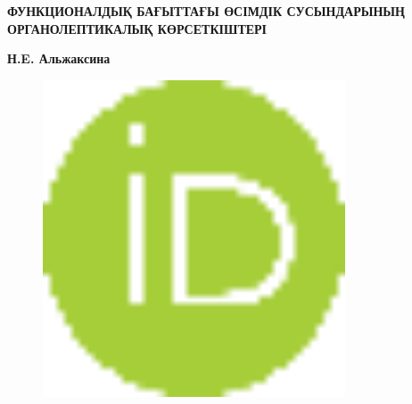 
{\bfseries ФУНКЦИОНАЛДЫҚ БАҒЫТТАҒЫ ӨСІМДІК СУСЫНДАРЫНЫҢ ОРГАНОЛЕПТИКАЛЫҚ
КӨРСЕТКІШТЕРІ}

{\bfseries Н.E. Альжаксина}
\begin{figure}[H]
	\centering
	\includegraphics[width=0.8\textwidth]{media/pish2/image5}
	\caption*{}
\end{figure}

